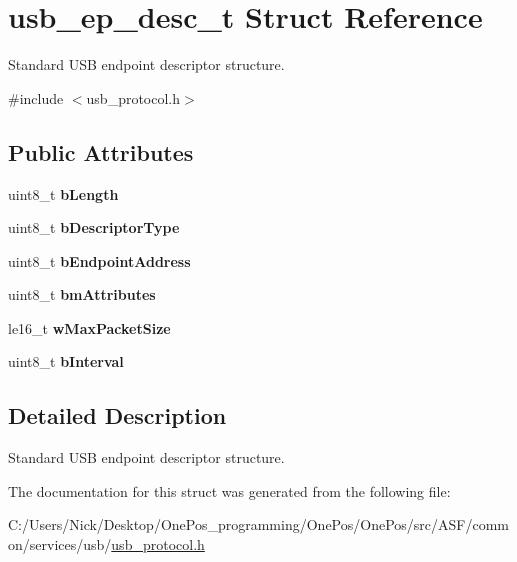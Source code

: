 \hypertarget{structusb__ep__desc__t}{\section{usb\-\_\-ep\-\_\-desc\-\_\-t Struct Reference}
\label{structusb__ep__desc__t}
}


Standard U\-S\-B endpoint descriptor structure.  




{\ttfamily \#include $<$usb\-\_\-protocol.\-h$>$}

\subsection*{Public Attributes}
\begin{DoxyCompactItemize}
\item 
\hypertarget{structusb__ep__desc__t_a1b1f36413d7701c85786390adc914671}{uint8\-\_\-t {\bfseries b\-Length}}\label{structusb__ep__desc__t_a1b1f36413d7701c85786390adc914671}

\item 
\hypertarget{structusb__ep__desc__t_ae881cfe829a29de12aea7dcc64c84d76}{uint8\-\_\-t {\bfseries b\-Descriptor\-Type}}\label{structusb__ep__desc__t_ae881cfe829a29de12aea7dcc64c84d76}

\item 
\hypertarget{structusb__ep__desc__t_ae72d2c478693d43712626763e1b9f311}{uint8\-\_\-t {\bfseries b\-Endpoint\-Address}}\label{structusb__ep__desc__t_ae72d2c478693d43712626763e1b9f311}

\item 
\hypertarget{structusb__ep__desc__t_ae4a54c991f53573380f4500395ed2e1a}{uint8\-\_\-t {\bfseries bm\-Attributes}}\label{structusb__ep__desc__t_ae4a54c991f53573380f4500395ed2e1a}

\item 
\hypertarget{structusb__ep__desc__t_a7224435989a3b19385f6c37f9e606313}{le16\-\_\-t {\bfseries w\-Max\-Packet\-Size}}\label{structusb__ep__desc__t_a7224435989a3b19385f6c37f9e606313}

\item 
\hypertarget{structusb__ep__desc__t_aa1dac2219f2a658d66e768f138604f1c}{uint8\-\_\-t {\bfseries b\-Interval}}\label{structusb__ep__desc__t_aa1dac2219f2a658d66e768f138604f1c}

\end{DoxyCompactItemize}


\subsection{Detailed Description}
Standard U\-S\-B endpoint descriptor structure. 

The documentation for this struct was generated from the following file\-:\begin{DoxyCompactItemize}
\item 
C\-:/\-Users/\-Nick/\-Desktop/\-One\-Pos\-\_\-programming/\-One\-Pos/\-One\-Pos/src/\-A\-S\-F/common/services/usb/\hyperlink{usb__protocol_8h}{usb\-\_\-protocol.\-h}\end{DoxyCompactItemize}
